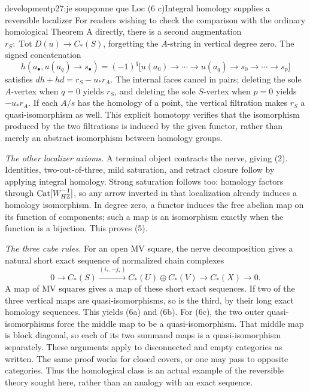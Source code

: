 \begin{dcomment}{development}{p27:je soupçonne que Loc (6 c)}{Integral homology supplies a reversible localizer}
For readers wishing to check the comparison with the ordinary homological Theorem A directly, there is a second augmentation $r_S:\operatorname{Tot}D(u)\to C_*(S)$, forgetting the $A$-string in vertical degree zero. The signed concatenation
\[
h(a_\bullet,u(a_q)\to s_\bullet)
 =(-1)^q\bigl[u(a_0)\to\cdots\to u(a_q)\to s_0\to\cdots\to s_p\bigr]
\]
satisfies $dh+hd=r_S-u_*r_A$. The internal faces cancel in pairs; deleting the sole $A$-vertex when $q=0$ yields $r_S$, and deleting the sole $S$-vertex when $p=0$ yields $-u_*r_A$. If each $A/s$ has the homology of a point, the vertical filtration makes $r_S$ a quasi-isomorphism as well. This explicit homotopy verifies that the isomorphism produced by the two filtrations is induced by the given functor, rather than merely an abstract isomorphism between homology groups.

\emph{The other localizer axioms.} A terminal object contracts the nerve, giving (2). Identities, two-out-of-three, mild saturation, and retract closure follow by applying integral homology. Strong saturation follows too: homology factors through $\mathrm{Cat}[W_{H\mathbb Z}^{-1}]$, so any arrow inverted in that localization already induces a homology isomorphism. In degree zero, a functor induces the free abelian map on its function of components; such a map is an isomorphism exactly when the function is a bijection. This proves (5).

\emph{The three cube rules.} For an open MV square, the nerve decomposition gives a natural short exact sequence of normalized chain complexes
\[
0\longrightarrow C_*(S)
 \xrightarrow{(i_*,-j_*)}C_*(U)\oplus C_*(V)
 \longrightarrow C_*(X)\longrightarrow0.
\]
A map of MV squares gives a map of these short exact sequences. If two of the three vertical maps are quasi-isomorphisms, so is the third, by their long exact homology sequences. This yields (6a) and (6b). For (6c), the two outer quasi-isomorphisms force the middle map to be a quasi-isomorphism. That middle map is block diagonal, so each of its two summand maps is a quasi-isomorphism separately. These arguments apply to disconnected and empty categories as written. The same proof works for closed covers, or one may pass to opposite categories. Thus the homological class is an actual example of the reversible theory sought here, rather than an analogy with an exact sequence.
\end{dcomment}


